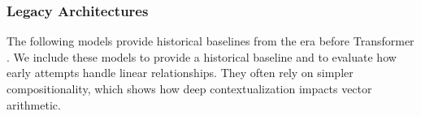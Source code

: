 

\subsubsection{Legacy Architectures}
The following models provide historical baselines from the era before Transformer \cite{attention}. We include these models to provide a historical baseline and to evaluate how early attempts handle linear relationships. They often rely on simpler compositionality, which shows how deep contextualization impacts vector arithmetic.

